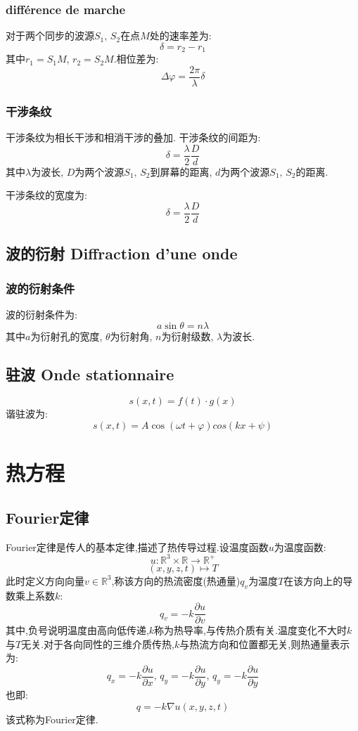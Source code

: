 \documentclass[12pt, a4paper, oneside]{ctexbook}
\newcommand{\pian }{\partial}%
\newcommand{\R }{\mathbb{R}}%
\begin{document}
\subsubsection{différence de marche}
对于两个同步的波源$S_1,\,S_2$在点$M$处的速率差为:
$$
\delta=r_2-r_1
$$
其中$r_1=S_1M$, $r_2=S_2M$.相位差为:
$$
\Delta \varphi=\frac{2\pi}{\lambda}\delta
$$
\subsubsection{干涉条纹}
干涉条纹为相长干涉和相消干涉的叠加.
干涉条纹的间距为:
$$
\delta=\frac{\lambda}{2}\frac{D}{d}
$$
其中$\lambda$为波长,
$D$为两个波源$S_1,\,S_2$到屏幕的距离,
$d$为两个波源$S_1,\,S_2$的距离.


干涉条纹的宽度为:
$$
\delta=\frac{\lambda}{2}\frac{D}{d}
$$

\subsection{波的衍射 Diffraction d'une onde}
\subsubsection{波的衍射条件}
波的衍射条件为:
$$
a\sin\theta=n\lambda
$$
其中$a$为衍射孔的宽度,
$\theta$为衍射角,
$n$为衍射级数,
$\lambda$为波长.
\subsection{驻波 Onde stationnaire}
$$
s(x,t)=f(t)\cdot g(x)
$$
谐驻波为:
$$
s(x,t)=A\cos(\omega t+\varphi)cos(kx+\psi)
$$







\section{热方程}
\subsection{Fourier定律}
Fourier定律是传人的基本定律,描述了热传导过程.设温度函数$u$为温度函数:
$$
  u:\R^3\times \R\rightarrow \R^+
$$
$$
  (x,y,z,t)\mapsto T
$$
此时定义方向向量$v\in\R^3$,称该方向的热流密度(热通量)$q_v$为温度$T$在该方向上的导数乘上系数$k$:
$$
  q_v=-k\frac{\pian u}{\pian v}
$$
其中,负号说明温度由高向低传递,$k$称为热导率,与传热介质有关.温度变化不大时$k$与$T$无关.对于各向同性的三维介质传热,$k$与热流方向和位置都无关,则热通量表示为:
$$
  q_x=-k\frac{\pian u}{\pian x},\,q_y=-k\frac{\pian u}{\pian y},\,q_y=-k\frac{\pian u}{\pian y}
$$
也即:
$$
  q=-k\nabla u(x,y,z,t)
$$
该式称为Fourier定律.
\end{document}
